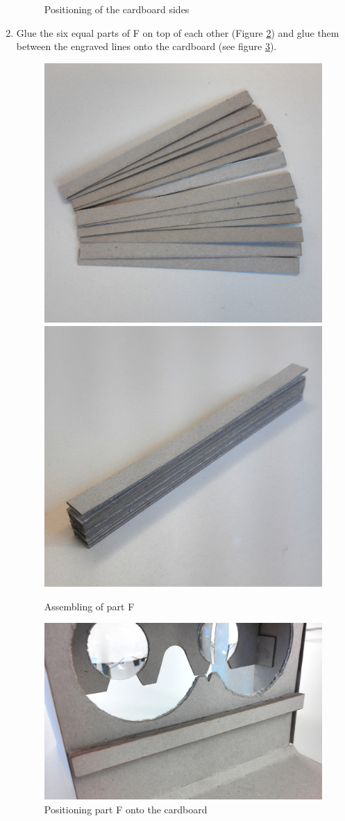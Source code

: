 \documentclass[../../Cardboard_Assembling]{subfiles}
\begin{document}
\begin{enumerate}
\begin{figure}[htb]
		\caption{Positioning of the cardboard sides}
		\label{fig:screenshot020}
	\end{figure}
	\clearpage
	\item Glue the six equal parts of F on top of each other (Figure \ref{fig:screenshot021}) and glue them between the engraved lines onto the cardboard (see figure \ref{fig:screenshot022}).
	\begin{figure}[htb]
		\centering
		\includegraphics[width=0.45\linewidth]{partF01}
		\includegraphics[width=0.45\linewidth]{partF02}
		\caption{Assembling of part F}
		\label{fig:screenshot021}
	\end{figure}
	\begin{figure}[!htb]
		\centering
		\includegraphics[width=0.75\linewidth]{partF03}
		\caption{Positioning part F onto the cardboard}
		\label{fig:screenshot022}
	\end{figure}
	\clearpage	
	

\end{enumerate}
\end{document}
